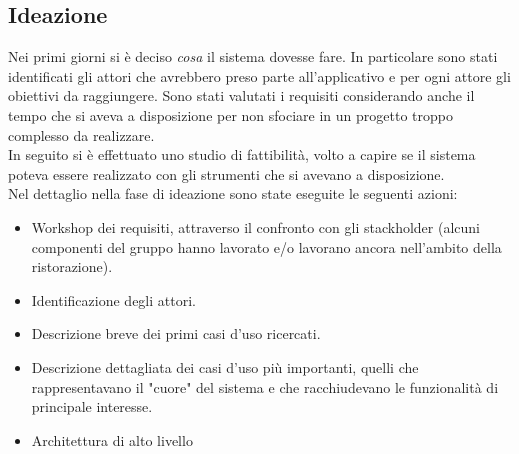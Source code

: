 \subsection{Ideazione}
Nei primi giorni si è deciso \textit{cosa} il sistema dovesse fare. In particolare sono stati identificati gli attori che avrebbero preso parte all'applicativo e per ogni attore gli obiettivi da raggiungere. Sono stati valutati i requisiti considerando anche il tempo che si aveva a disposizione per non sfociare in un progetto troppo complesso da realizzare.
\\In seguito si è effettuato uno studio di fattibilità, volto a capire se il sistema poteva essere realizzato con gli strumenti che si avevano a disposizione. 
\\Nel dettaglio nella fase di ideazione sono state eseguite le seguenti azioni:
\begin{itemize}
	\item Workshop dei requisiti, attraverso il confronto con gli stackholder (alcuni componenti del gruppo hanno lavorato e/o lavorano ancora nell'ambito della ristorazione).
	\item Identificazione degli attori.
	\item Descrizione breve dei primi casi d'uso ricercati.
	\item Descrizione dettagliata dei casi d'uso più importanti, quelli che rappresentavano il "cuore" del sistema e che racchiudevano le funzionalità di principale interesse.
	\item Architettura di alto livello 	
\end{itemize} 

